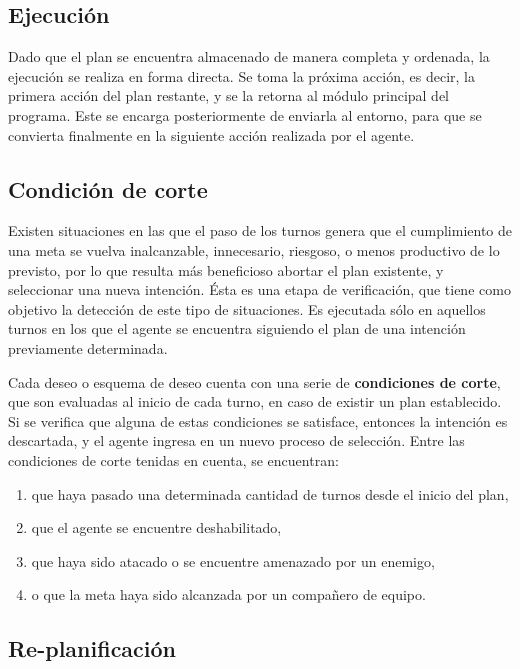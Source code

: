 \documentclass[oneside]{book}
\begin{document}
\subsection{Ejecución}

\label{sec:ejecucion}

Dado que el plan se encuentra almacenado de manera completa y ordenada, la ejecución se 
realiza en forma directa. Se toma la próxima acción, es decir, la primera acción del plan 
restante, y se la retorna al módulo principal del programa. Este se encarga posteriormente 
de enviarla al entorno, para que se convierta finalmente en la siguiente acción realizada 
por el agente.

\subsection{Condición de corte}

\label{sec:condicionDeCorte}

Existen situaciones en las que el paso de los turnos genera que el cumplimiento de una 
meta se vuelva inalcanzable, innecesario, riesgoso, o menos productivo de lo previsto, por 
lo que resulta más beneficioso abortar el plan existente, y seleccionar una nueva intención. 
Ésta es una etapa de verificación, que tiene como objetivo la detección de este tipo de 
situaciones. Es ejecutada sólo en aquellos turnos en los que el agente se encuentra 
siguiendo el plan de una intención previamente determinada.

Cada deseo o esquema de deseo cuenta con una serie de \textbf{condiciones de corte}, que 
son evaluadas al inicio de cada turno, en caso de existir un plan establecido. Si se verifica 
que alguna de estas condiciones se satisface, entonces la intención es descartada, y el 
agente ingresa en un nuevo proceso de selección. 
Entre las condiciones de corte tenidas en cuenta, se encuentran: 

\begin{enumerate}
	\item que haya pasado una determinada 
		cantidad de turnos desde el inicio del plan, 
	\item que el agente se encuentre deshabilitado, 
	\item que 
		haya sido atacado o se encuentre amenazado por un enemigo, 
	\item o que la meta haya sido alcanzada 
		por un compañero de equipo.
\end{enumerate}

\subsection{Re-planificación}
\end{document}
